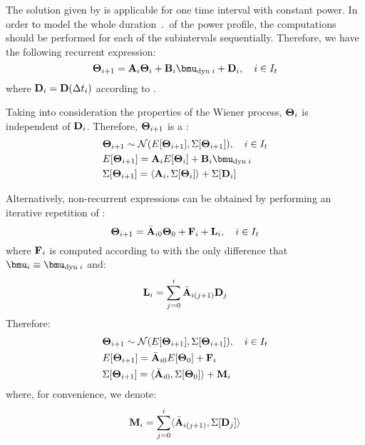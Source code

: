The solution given by  is applicable for one time interval with constant power. In order to model the whole duration $\period$ of the power profile, the computations should be performed for each of the subintervals sequentially. Therefore, we have the following recurrent expression:
\begin{equation} \equlabel{tta-fourier-recurrence-noise}
  \vtemp_{i + 1} = \m{A}_i \vtemp_i + \m{B}_i \vmean{\dyn \; i} + \m{D}_i, \sep i \in \timeindex
\end{equation}
where $\mathbf{D}_i = \mathbf{D}(\Delta t_i)$ according to .

Taking into consideration the properties of the Wiener process, $\mathbf{\Theta}_i$ is independent of $\mathbf{D}_i$. Therefore, $\mathbf{\Theta}_{i+1}$ is a \mnrv:
\begin{align*}
  & \vtemp_{i + 1} \sim \normal(\expect{\vtemp_{i + 1}}, \cov{\vtemp_{i + 1}}), \sep i \in \timeindex \\
  & \expect{\vtemp_{i+1}} = \m{A}_i \expect{\vtemp_i} + \m{B}_i \vmean{\dyn \; i} \\
  & \cov{\vtemp_{i+1}} = \dbl{\m{A}_i, \cov{\vtemp_i}} + \cov{\m{D}_i}
\end{align*}

Alternatively, non-recurrent expressions can be obtained by performing an iterative repetition of :
\begin{equation} \equlabel{tta-fourier-noise-non-recurrent}
  \vtemp_{i + 1} = \am{A}_{i0} \vtemp_0 + \m{F}_i + \v{L}_i, \sep i \in \timeindex
\end{equation}
where $\mathbf{F}_i$ is computed according to  with the only difference that $\vmean{i} \equiv \vmean{\dyn \; i}$ and:
\begin{equation} \equlabel{l}
  \v{L}_i = \sum_{j = 0}^{i} \am{A}_{i(j+1)} \m{D}_j
\end{equation}
Therefore:
\begin{align*}
  & \mathbf{\Theta}_{i + 1} \sim \mathcal{N}(E[\mathbf{\Theta}_{i + 1}], \Sigma[\mathbf{\Theta}_{i + 1}]), \hspace{10pt} i \in I_t \\
  & E[\mathbf{\Theta}_{i + 1}] = \Bar{\mathbf{A}}_{i0} E[\mathbf{\Theta}_0] + \mathbf{F}_i \\
  & \Sigma[\mathbf{\Theta}_{i + 1}] = \langle \Bar{\mathbf{A}}_{i0}, \Sigma[\mathbf{\Theta}_0] \rangle + \mathbf{M}_i
\end{align*}
where, for convenience, we denote:
\begin{equation} \equlabel{m}
  \m{M}_i = \sum_{j = 0}^{i} \dbl{\am{A}_{i(j+1)}, \cov{\m{D}_j}}
\end{equation}
